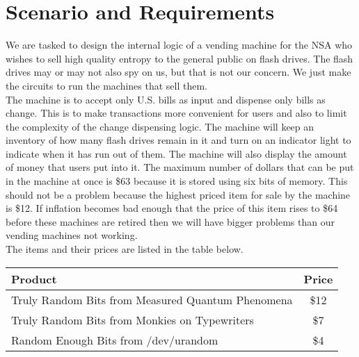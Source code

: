 \section{Scenario and Requirements} 

We are tasked to design the internal logic of a vending machine for the NSA who wishes to sell high quality entropy to the general public on flash drives. The flash drives may or may not also spy on us, but that is not our concern. We just make the circuits to run the machines that sell them. \\

The machine is to accept only U.S. bills as input and dispense only bills as change. This is to make transactions more convenient for users and also to limit the complexity of the change dispensing logic. The machine will keep an inventory of how many flash drives remain in it and turn on an indicator light to indicate when it has run out of them. The machine will also display the amount of money that users put into it. The maximum number of dollars that can be put in the machine at once is \$63 because it is stored using six bits of memory. This should not be a problem because the highest priced item for sale by the machine is \$12. If inflation becomes bad enough that the price of this item rises to \$64 before these machines are retired then we will have bigger problems than our vending machines not working. \\

The items and their prices are listed in the table below. 

\begin{tabular}{|l|c|}
\hline 
\textbf{Product} & \textbf{Price} \\ 
\hline 
Truly Random Bits from Measured Quantum Phenomena  & \$12 \\ 
\hline 
Truly Random Bits from Monkies on Typewriters & \$7 \\ 
\hline 
Random Enough Bits from /dev/urandom & \$4 \\ 
\hline 
\end{tabular} 